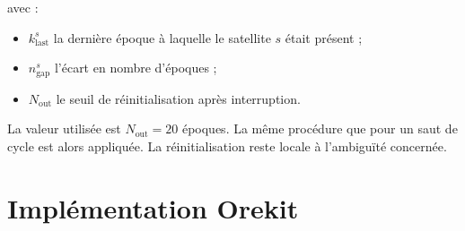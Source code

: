 avec :

\begin{itemize}
    \item $k_{\mathrm{last}}^s$ la dernière époque à laquelle le satellite $s$
    était présent ;
    \item $n_{\mathrm{gap}}^s$ l'écart en nombre d'époques ;
    \item $N_{\mathrm{out}}$ le seuil de réinitialisation après interruption.
\end{itemize}

La valeur utilisée est $N_{\mathrm{out}}=20$ époques. La même procédure que
pour un saut de cycle est alors appliquée. La réinitialisation reste locale à
l'ambiguïté concernée.

\section{Implémentation Orekit}

